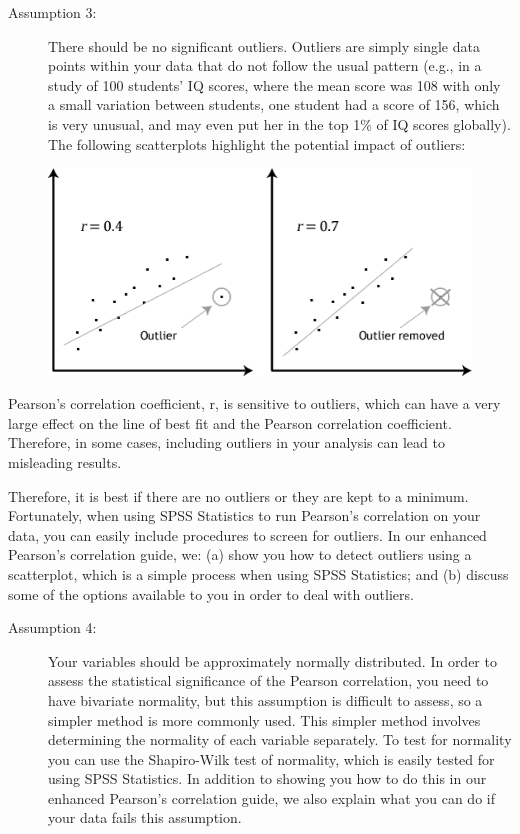 \documentclass[]{article}
\begin{document}
\begin{description}
\item[Assumption 3:] There should be no significant outliers. Outliers are simply single data points within your data that do not follow the usual pattern (e.g., in a study of 100 students’ IQ scores, where the mean score was 108 with only a small variation between students, one student had a score of 156, which is very unusual, and may even put her in the top 1\% of IQ scores globally). The following scatterplots highlight the potential impact of outliers:
\end{description}
\begin{figure}
\centering
\includegraphics[width=0.7\linewidth]{images/pearson-outliers}
\caption{}
\label{fig:pearson-outliers}
\end{figure}


Pearson’s correlation coefficient, r, is sensitive to outliers, which can have a very large effect on the line of best fit and the Pearson correlation coefficient. Therefore, in some cases, including outliers in your analysis can lead to misleading results. 

Therefore, it is best if there are no outliers or they are kept to a minimum. Fortunately, when using SPSS Statistics to run Pearson’s correlation on your data, you can easily include procedures to screen for outliers. In our enhanced Pearson’s correlation guide, we: (a) show you how to detect outliers using a scatterplot, which is a simple process when using SPSS Statistics; and (b) discuss some of the options available to you in order to deal with outliers.

\begin{description}
	\item[Assumption 4:] Your variables should be approximately normally distributed. In order to assess the statistical significance of the Pearson correlation, you need to have bivariate normality, but this assumption is difficult to assess, so a simpler method is more commonly used. This simpler method involves determining the normality of each variable separately. To test for normality you can use the Shapiro-Wilk test of normality, which is easily tested for using SPSS Statistics. In addition to showing you how to do this in our enhanced Pearson’s correlation guide, we also explain what you can do if your data fails this assumption.
\end{description}
\end{document}
